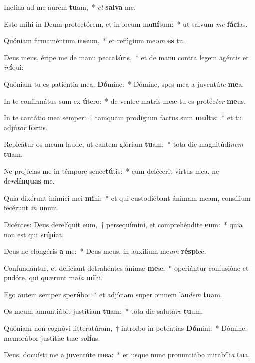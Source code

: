 \item Inclína ad me aurem \textbf{tu}am,~* \textit{et} \textbf{sal}\textbf{va} me.
\item Esto mihi in Deum protectórem, et in locum mu\textbf{ní}tum:~* ut salvum \textit{me} \textbf{fá}\textbf{ci}as.
\item Quóniam firmaméntum \textbf{me}um,~* et refúgium me\textit{um} \textbf{es} tu.
\item Deus meus, éripe me de manu pecca\textbf{tó}ris,~* et de manu contra legem agéntis et \textit{in}\textbf{í}qui:
\item Quóniam tu es patiéntia mea, \textbf{Dó}mine:~* Dómine, spes mea a juventú\textit{te} \textbf{me}a.
\item In te confirmátus sum ex \textbf{ú}tero:~* de ventre matris meæ tu es protéc\textit{tor} \textbf{me}us.
\item In te cantátio mea semper:~† tamquam prodígium factus sum \textbf{mul}tis:~* et tu adjú\textit{tor} \textbf{for}tis.
\item Repleátur os meum laude, ut cantem glóriam \textbf{tu}am:~* tota die magnitúdi\textit{nem} \textbf{tu}am.
\item Ne projícias me in témpore senec\textbf{tú}tis:~* cum defécerit virtus mea, ne de\textit{re}\textbf{lín}\textbf{quas} me.
\item Quia dixérunt inimíci mei \textbf{mi}hi:~* et qui custodiébant ánimam meam, consílium fecérunt \textit{in} \textbf{u}num.
\item Dicéntes: Deus derelíquit eum,~† persequímini, et comprehéndite \textbf{e}um:~* quia non est qui \textit{e}\textbf{rí}\textbf{pi}at.
\item Deus ne elongéris \textbf{a} me:~* Deus meus, in auxílium me\textit{um} \textbf{ré}\textbf{spi}ce.
\item Confundántur, et defíciant detrahéntes ánimæ \textbf{me}æ:~* operiántur confusióne et pudóre, qui quærunt ma\textit{la} \textbf{mi}hi.
\item Ego autem semper spe\textbf{rá}bo:~* et adjíciam super omnem lau\textit{dem} \textbf{tu}am.
\item Os meum annuntiábit justítiam \textbf{tu}am:~* tota die salutá\textit{re} \textbf{tu}um.
\item Quóniam non cognóvi litteratúram,~† introíbo in poténtias \textbf{Dó}mini:~* Dómine, memorábor justítiæ tuæ \textit{so}\textbf{lí}us.
\item Deus, docuísti me a juventúte \textbf{me}a:~* et usque nunc pronuntiábo mirabíli\textit{a} \textbf{tu}a.

